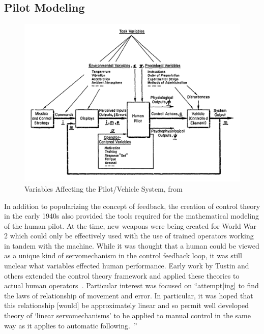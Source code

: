 \documentclass[float=false, crop=false]{standalone}
\begin{document}
\subsection{Pilot Modeling}
\begin{figure}[tb]
    \begin{center}
        \includegraphics[width=0.8\linewidth]{./../img/Screen Shot 2018-07-25 at 10.37.08 AM.png}
        \caption{Variables Affecting the Pilot/Vehicle System, from~\cite{McRuer1974}}
        \label{figure:mcruer1974}
    \end{center}
\end{figure}

In addition to popularizing the concept of feedback, the creation of control theory in the early 1940s also provided the tools required for the mathematical modeling of the human pilot.
At the time, new weapons were being created for World War 2 which could only be effectively used with the use of trained operators working in tandem with the machine.
While it was thought that a human could be viewed as a unique kind of servomechanism in the control feedback loop, it was still unclear what variables effected human performance.
Early work by Tustin and others extended the control theory framework and applied these theories to actual human operators~\cite{tustininvestigation}.
Particular interest was focused on ``attempt[ing] to find the laws of relationship of movement and error. In particular, it was hoped that this relationship [would] be approximately linear and so permit well developed theory of `linear servomechanisms' to be applied to manual control in the same way as it applies to automatic following.~\cite{tustininvestigation}''
\end{document}
